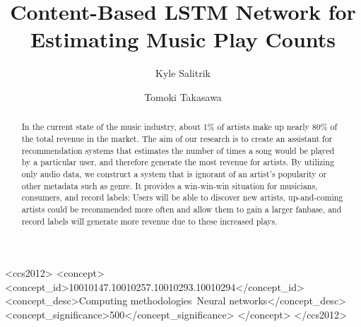 \documentclass[acmtog, 11pt]{acmart}
\begin{document}
\title{Content-Based LSTM Network for Estimating Music Play Counts}

\author{Kyle Salitrik}
\author{Tomoki Takasawa}


\begin{abstract}
In the current state of the music industry, about 1\% of artists make up nearly 80\% of the total revenue in the market. The aim of our research is to create an assistant for recommendation systems that estimates the number of times a song would be played by a particular user, and therefore generate the most revenue for artists. By utilizing only audio data, we construct a system that is ignorant of an artist's popularity or other metadata such as genre. It provides a win-win-win situation for musicians, consumers, and record labels: Users will be able to discover new artists, up-and-coming artists could be recommended more often and allow them to gain a larger fanbase, and record labels will generate more revenue due to these increased plays.
\end{abstract}


%
%
\begin{CCSXML}
<ccs2012>
<concept>
<concept_id>10010147.10010257.10010293.10010294</concept_id>
<concept_desc>Computing methodologies~Neural networks</concept_desc>
<concept_significance>500</concept_significance>
</concept>
</ccs2012>
\end{CCSXML}

%
%





\maketitle

\end{document}
